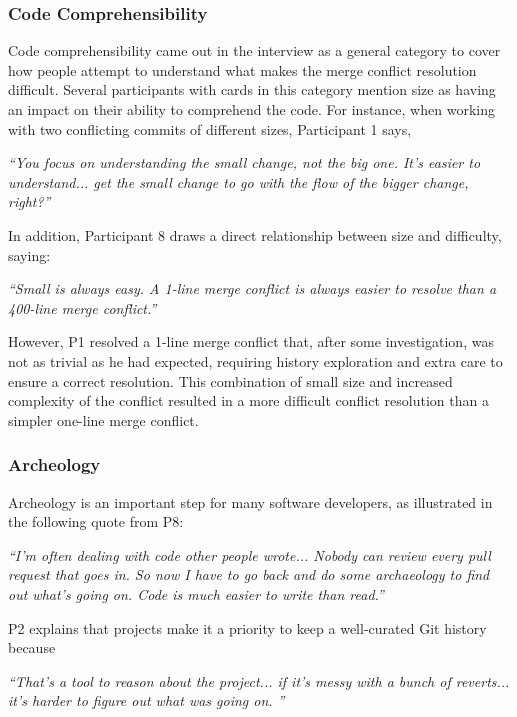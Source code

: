 \subsubsection{Code Comprehensibility}
Code comprehensibility came out in the interview as a general category to cover how people attempt to understand what makes the merge conflict resolution difficult. Several participants with cards in this category mention size as having an impact on their ability to comprehend the code. For instance, when working with two conflicting commits of different sizes, Participant 1 says,
\begin{displayquote}
\textit{``You focus on understanding the small change, not the big one. It's easier to understand... get the small change to go with the flow of the bigger change, right?''}
\end{displayquote}	
In addition, Participant 8 draws a direct relationship between size and difficulty, saying:
\begin{displayquote}
\textit{``Small is always easy. A 1-line merge conflict is always easier to resolve than a 400-line merge conflict.''}
\end{displayquote}
However, P1 resolved a 1-line merge conflict that, after some investigation, was not as trivial as he had expected, requiring history exploration and extra care to ensure a correct resolution. This combination of small size and increased complexity of the conflict resulted in a more difficult conflict resolution than a simpler one-line merge conflict.

\subsubsection{Archeology}
Archeology is an important step for many software developers, as illustrated in the following quote from P8:
\begin{displayquote}
\textit{``I'm often dealing with code other people wrote... Nobody can review every pull request that goes in. So now I have to go back and do some archaeology to find out what's going on. Code is much easier to write than read.''}
\end{displayquote}
P2 explains that projects make it a priority to keep a well-curated Git history because
\begin{displayquote}
\textit{``That's a tool to reason about the project... if it's messy with a bunch of reverts... it's harder to figure out what was going on.	''}
\end{displayquote}

